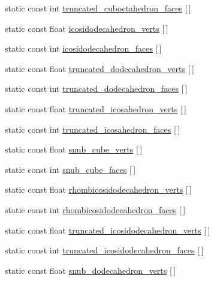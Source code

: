 \begin{DoxyCompactItemize}
\item 
static const int \hyperlink{namespacetrimesh_a65ac2f53881b8f240346cff7fe0d9631}{truncated\+\_\+cuboctahedron\+\_\+faces} \mbox{[}$\,$\mbox{]}
\item 
static const float \hyperlink{namespacetrimesh_abd2c275c04d7dbd15481684b1c0d4590}{icosidodecahedron\+\_\+verts} \mbox{[}$\,$\mbox{]}
\item 
static const int \hyperlink{namespacetrimesh_a7bb716308df847698b8d3bfafe2c7539}{icosidodecahedron\+\_\+faces} \mbox{[}$\,$\mbox{]}
\item 
static const float \hyperlink{namespacetrimesh_a86aa0c70c1ce84f8e9427de9d7b03cf1}{truncated\+\_\+dodecahedron\+\_\+verts} \mbox{[}$\,$\mbox{]}
\item 
static const int \hyperlink{namespacetrimesh_a483ac5f8a9620be17f403a0c28d41201}{truncated\+\_\+dodecahedron\+\_\+faces} \mbox{[}$\,$\mbox{]}
\item 
static const float \hyperlink{namespacetrimesh_a74279c73872059842135011950072ffd}{truncated\+\_\+icosahedron\+\_\+verts} \mbox{[}$\,$\mbox{]}
\item 
static const int \hyperlink{namespacetrimesh_a161dc31af3d4a1c4abd5df1b7ced25a9}{truncated\+\_\+icosahedron\+\_\+faces} \mbox{[}$\,$\mbox{]}
\item 
static const float \hyperlink{namespacetrimesh_ad23260703fa36d0adee643160aaff2af}{snub\+\_\+cube\+\_\+verts} \mbox{[}$\,$\mbox{]}
\item 
static const int \hyperlink{namespacetrimesh_a4c96aacc9c374918727214fbb25fc151}{snub\+\_\+cube\+\_\+faces} \mbox{[}$\,$\mbox{]}
\item 
static const float \hyperlink{namespacetrimesh_af9e214997114b405ef2efb0e5b877268}{rhombicosidodecahedron\+\_\+verts} \mbox{[}$\,$\mbox{]}
\item 
static const int \hyperlink{namespacetrimesh_aa8ba03d3cb95d85d7223e543b9c20a41}{rhombicosidodecahedron\+\_\+faces} \mbox{[}$\,$\mbox{]}
\item 
static const float \hyperlink{namespacetrimesh_ae5bcb75c2f03f0b8a066f545a7f306e2}{truncated\+\_\+icosidodecahedron\+\_\+verts} \mbox{[}$\,$\mbox{]}
\item 
static const int \hyperlink{namespacetrimesh_a83d53ca77f033a31a851b154c79895fa}{truncated\+\_\+icosidodecahedron\+\_\+faces} \mbox{[}$\,$\mbox{]}
\item 
static const float \hyperlink{namespacetrimesh_a237743115a28c6333571e5a16ee379c5}{snub\+\_\+dodecahedron\+\_\+verts} \mbox{[}$\,$\mbox{]}
\item 

\end{DoxyCompactItemize}
